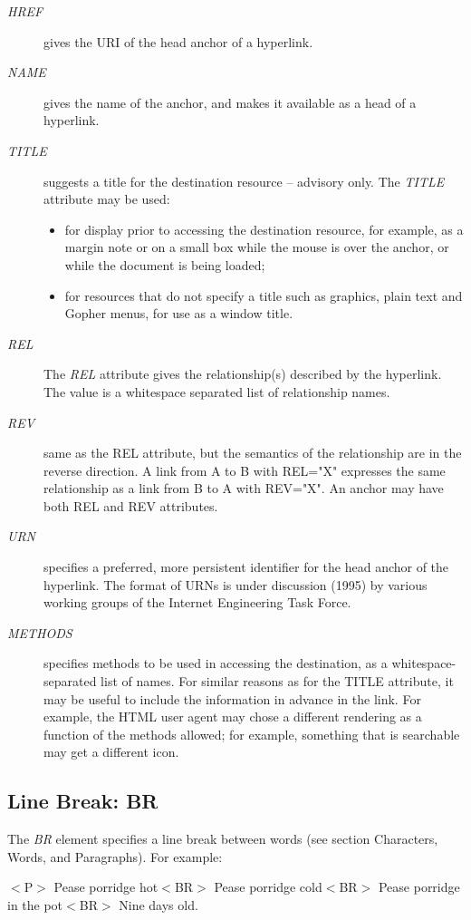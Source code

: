 \par \begin{description}\item[{\it HREF}]
gives the URI of the head anchor of a hyperlink.
\item[{\it NAME}]
gives the name of the anchor, and makes it available as
a head of a hyperlink.
\item[{\it TITLE}]
suggests a title for the destination resource -- advisory only.  
The {\it TITLE} attribute may be used:
\begin{itemize}\item 
for display prior to accessing the destination resource, for
example, as a margin note or on a small box while the mouse is over
the anchor, or while the document is being loaded;
\item 
for resources that do not specify a title such as graphics, plain
text and Gopher menus, for use as a window title.
\end{itemize}\item[{\it REL}]
The {\it REL} attribute gives the relationship(s) described
by the hyperlink.  The value is a whitespace separated list of
relationship names.
\item[{\it REV}]
same as the REL attribute, but the semantics of the
relationship are in the reverse direction.  A link from A to B with
REL="X" expresses the same relationship as a link from B to A with
REV="X".  An anchor may have both REL and REV attributes.
\item[{\it URN}]
specifies a preferred, more persistent identifier for the
head anchor of the hyperlink.  The format of URNs is under discussion
(1995) by various working groups of the Internet Engineering Task
Force.
\item[{\it METHODS}]
specifies methods to be used in accessing the
destination, as a whitespace-separated list of names.  For similar
reasons as for the TITLE attribute, it may be useful to include the
information in advance in the link.  For example, the HTML user agent
may chose a different rendering as a function of the methods allowed;
for example, something that is searchable may get a different icon.
\end{description}\subsection*{Line Break:  BR}\par 
The {\it BR} element specifies a line break between words (see
section Characters, Words, and Paragraphs).  For example:
\par $<$P$>$ Pease porridge hot$<$BR$>$
Pease porridge cold$<$BR$>$
Pease porridge in the pot$<$BR$>$
Nine days old.
